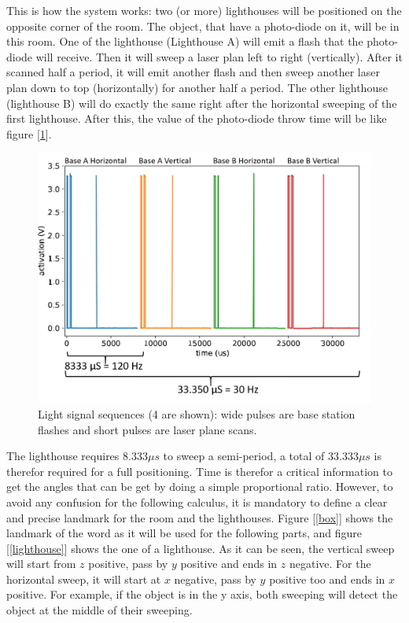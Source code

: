 \documentclass{vldb}
\begin{document}
This is how the system works: two (or more) lighthouses will be positioned on the opposite corner of the room. The object, that have a photo-diode on it, will be in this room. One of the lighthouse (Lighthouse A) will emit a flash that the photo-diode will receive. Then it will sweep a laser plan left to right (vertically). After it scanned half a period, it will emit another flash and then sweep another laser plan down to top (horizontally) for another half a period. The other lighthouse (lighthouse B) will do exactly the same right after the horizontal sweeping of the first lighthouse. After this, the value of the photo-diode throw time will be like figure [\ref{photo}].
\begin{figure}
\centering
\includegraphics[width=1.0\columnwidth]{Image/Signal2.png}
\caption{Light signal sequences (4 are shown): wide pulses are base station flashes and short pulses are laser plane scans.}
\label{photo}
\end{figure}
The lighthouse requires $8.333 \mu s$ to sweep a semi-period, a total of $33.333 \mu s$ is therefor required for a full positioning.
Time is therefor a critical information to get the angles that can be get by doing a simple proportional ratio. However, to avoid any confusion for the following calculus, it is mandatory to define a clear and precise landmark for the room and the lighthouses.
\bigbreak
Figure [\ref{box}] shows the landmark of the word as it will be used for the following parts, and figure [\ref{lighthouse}] shows the one of a lighthouse. As it can be seen, the vertical sweep will start from $z$ positive, pass by $y$ positive and ends in $z$ negative. For the horizontal sweep, it will start at $x$ negative, pass by $y$ positive too and ends in $x$ positive. For example, if the object is in the y axis, both sweeping will detect the object at the middle of their sweeping. \newline
\end{document}
